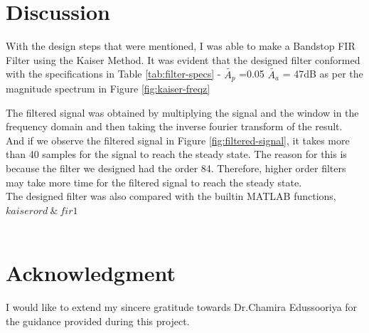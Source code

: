 \documentclass[11pt]{article}
\begin{document}
\section{Discussion}
With the design steps that were mentioned, I was able to make a Bandstop FIR Filter using the Kaiser Method. It was evident that the designed filter conformed with the specifications in
Table \ref{tab:filter-specs} - $\tilde{A_p}$ =0.05  $\tilde{A_a}$ = 47dB as per the magnitude spectrum in Figure \ref{fig:kaiser-freqz}

The filtered signal was obtained by multiplying the signal and the window in the frequency domain and then taking the inverse fourier transform of the result. And if we observe the filtered signal in Figure \ref{fig:filtered-signal}, it takes more than 40 samples for the signal to reach the steady state.
The reason for this is because the filter we designed had the order 84. Therefore, higher order filters may take more time for the filtered signal to reach the steady state.
\\The designed filter was also compared with the builtin MATLAB functions, $kaiserord \ \& \  fir1$
\\ 
\\
\section{Acknowledgment}
I would like to extend my sincere gratitude towards Dr.Chamira Edussooriya for the guidance provided during this project.

\newpage







\setlength{\voffset}{-2.54cm}
\setlength{\hoffset}{-2.54cm}
\end{document}
